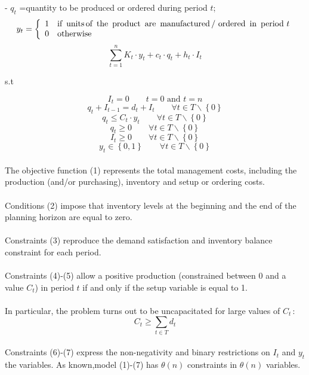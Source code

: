 \documentclass[a4paper,12pt,titlepage]{article}
\begin{document}
	- $q_t$ =quantity to be produced or ordered during period $t$;\\
	$$y_t=
	\bigg \{
	\begin{array}{ll}
	1\quad \text{if \,units\,of\, the\, product\, are\, manufactured\,/ ordered\, in\, period\,}\, t\\
	0\quad \text{otherwise}\\
	\end{array}
	$$
	\begin{equation}
		\sum_{t=1}^{n}K_t\cdot y_t+c_t\cdot q_t+h_t\cdot I_t
	\end{equation}
	\begin{center}
		s.t
	\end{center}
	\begin{equation}
		I_t =0\qquad t=0\,\, \text{and}\,\, t=n
	\end{equation}
	\begin{equation}
		q_t+I_{t-1}=d_t+I_t\qquad \forall t \in T\backslash\left\lbrace 0 \right\rbrace 
	\end{equation}
	\begin{equation}
		q_t \leq C_t\cdot y_t \qquad \forall t \in T\backslash\left\lbrace 0 \right\rbrace 
	\end{equation}
	\begin{equation}
		q_t\geq 0 \qquad \forall t \in T\backslash\left\lbrace 0 \right\rbrace 
	\end{equation}
	\begin{equation}
		I_t \geq 0 \qquad \forall t \in T\backslash\left\lbrace 0 \right\rbrace 
	\end{equation}
	\begin{equation}
		y_t \in \left\lbrace 0,1\right\rbrace \qquad \forall t \in T\backslash\left\lbrace 0 \right\rbrace 
	\end{equation}
	\\
	The objective function (1) represents the total management costs, including the production
	(and/or purchasing), inventory and setup or ordering costs.\\
	\\
	Conditions (2) impose that inventory levels at the beginning and the end of the planning horizon are equal to zero. \\
	\\
	Constraints (3) reproduce the
	demand satisfaction and inventory balance constraint for each period. \\
	\\
	Constraints (4)-(5) allow a positive production (constrained between $0$ and a value $C_t$) in period $t$ if and only if the setup variable is equal to 1. \\
	\\
	In particular, the problem turns out to be uncapacitated for large values of $C_t$\,:
	\begin{equation*}
		C_t \geq \sum_{t\in T}d_t
	\end{equation*}
	\\
	Constraints (6)-(7) express the non-negativity and binary restrictions on $I_t$ and $y_t$ the variables.
	As known,model (1)-(7) has $\theta (n)$ constraints in $\theta (n)$ variables.
	
\end{document}
